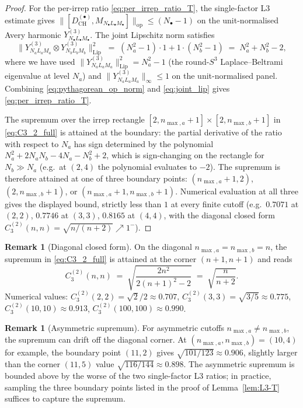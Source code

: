 \documentclass[11pt,a4paper]{article}
\theoremstyle{plain}
\theoremstyle{definition}
\newtheorem{remark}[theorem]{Remark}
\newcommand{\nmaxa}{n_{\max,a}}
\newcommand{\nmaxb}{n_{\max,b}}
\newcommand{\sthree}{S^{3}}
\newcommand{\opnorm}[1]{\lVert #1 \rVert_{\mathrm{op}}}
\newcommand{\norm}[1]{\lVert #1 \rVert}
\newcommand{\Mat}{M}
\newcommand{\DCH}{D_{\mathrm{CH}}}
\begin{document}
\begin{proof}
For the per-irrep ratio \eqref{eq:per_irrep_ratio_T}, the
single-factor L3 estimate \cite[Eq.~(3.18)]{loutey_paper38} gives
$\opnorm{[\DCH^{(\bullet)}, \Mat_{N_\bullet L_\bullet M_\bullet}]}
\le (N_\bullet - 1)$ on the unit-normalised Avery harmonic
$Y^{(3)}_{N_\bullet L_\bullet M_\bullet}$. The joint Lipschitz norm
satisfies
\begin{equation}\label{eq:joint_lip}
   \norm{Y^{(3)}_{N_a L_a M_a} \otimes Y^{(3)}_{N_b L_b M_b}}_{\mathrm{Lip}}^2
   \;=\; (N_a^2 - 1) \cdot 1 + 1 \cdot (N_b^2 - 1)
   \;=\; N_a^2 + N_b^2 - 2,
\end{equation}
where we have used $\norm{Y^{(3)}_{N_a L_a M_a}}_{\mathrm{Lip}}^2 =
N_a^2 - 1$ (the round-$\sthree$ Laplace--Beltrami eigenvalue at level
$N_a$) and $\norm{Y^{(3)}_{N_a L_a M_a}}_\infty \le 1$ on the
unit-normalised panel. Combining \eqref{eq:pythagorean_op_norm} and
\eqref{eq:joint_lip} gives
\eqref{eq:per_irrep_ratio_T}.

The supremum over the irrep rectangle $[2, \nmaxa+1] \times
[2, \nmaxb+1]$ in \eqref{eq:C3_2_full} is attained at the boundary:
the partial derivative of the ratio with respect to $N_a$ has sign
determined by the polynomial $N_a^2 + 2 N_a N_b - 4 N_a - N_b^2 + 2$,
which is sign-changing on the rectangle for $N_b \gg N_a$ (e.g.\ at
$(2, 4)$ the polynomial evaluates to $-2$). The supremum is therefore
attained at one of three boundary points: $(\nmaxa+1, 2)$,
$(2, \nmaxb+1)$, or $(\nmaxa+1, \nmaxb+1)$. Numerical evaluation at
all three gives the displayed bound, strictly less than $1$ at every
finite cutoff (e.g.\ $0.7071$ at $(2,2)$, $0.7746$ at $(3,3)$,
$0.8165$ at $(4,4)$, with the diagonal closed form
$C_3^{(2)}(n,n) = \sqrt{n/(n+2)} \nearrow 1^-$).
\end{proof}

\begin{remark}[Diagonal closed form]\label{rem:C3_2_diagonal}
On the diagonal $\nmaxa = \nmaxb = n$, the supremum in \eqref{eq:C3_2_full}
is attained at the corner $(n+1, n+1)$ and reads
\begin{equation*}
   C_3^{(2)}(n, n)
   \;=\; \sqrt{\frac{2 n^2}{2(n+1)^2 - 2}}
   \;=\; \sqrt{\frac{n}{n+2}}.
\end{equation*}
Numerical values: $C_3^{(2)}(2,2) = \sqrt{2}/2 \approx 0.707$,
$C_3^{(2)}(3,3) = \sqrt{3/5} \approx 0.775$, $C_3^{(2)}(10,10)
\approx 0.913$, $C_3^{(2)}(100,100) \approx 0.990$.
\end{remark}

\begin{remark}[Asymmetric supremum]\label{rem:asymmetric_sup}
For asymmetric cutoffs $\nmaxa \ne \nmaxb$, the supremum can drift off
the diagonal corner. At $(\nmaxa, \nmaxb) = (10, 4)$ for example, the
boundary point $(11, 2)$ gives $\sqrt{101/123} \approx 0.906$, slightly
larger than the corner $(11, 5)$ value $\sqrt{116/144} \approx 0.898$.
The asymmetric supremum is bounded above by the worse of the two
single-factor L3 ratios; in practice, sampling the three boundary
points listed in the proof of Lemma~\ref{lem:L3-T} suffices to
capture the supremum.
\end{remark}
\end{document}
